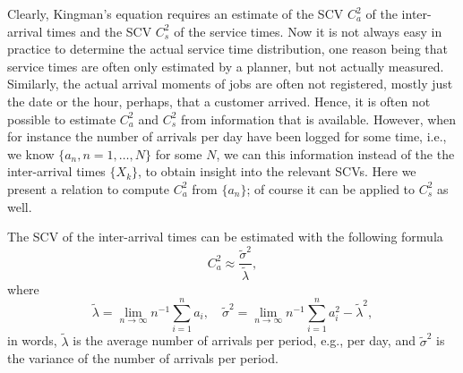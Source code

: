 Clearly, Kingman's equation requires an estimate of the SCV $C_a^2$ of
the inter-arrival times and the SCV $C_s^2$ of the service times. Now it is
not always easy in practice to determine the actual service time
distribution, one reason being that service times are often only
estimated by a planner, but not actually measured. Similarly, the
actual arrival moments of jobs are often not registered, mostly just
the date or the hour, perhaps, that a customer arrived.  Hence, it is
often not possible to estimate $C_a^2$ and $C_s^2$ from information
that is available.  However, when for instance the number of arrivals
per day have been logged for some time, i.e., we know
$\{a_n, n=1,\ldots, N\}$ for some $N$, we can this information instead
of the the inter-arrival times $\{X_k\}$, to obtain insight into the
relevant SCVs.  Here we present a relation to compute $C_a^2$ from
$\{a_n\}$; of course it can be applied to $C_s^2$ as well.

\begin{theorem} The SCV of the inter-arrival times can be estimated
  with the following formula
\begin{equation*}
C_a^2 \approx \frac{\tilde \sigma^2}{\tilde \lambda},
\end{equation*}
where 
\begin{equation*}
\tilde  \lambda = \lim_{n\to\infty} n^{-1} \sum_{i=1}^n a_i,\quad  
\tilde  \sigma^2 = \lim_{n\to\infty} n^{-1} \sum_{i=1}^n a_i^2 - \tilde \lambda^2,
\end{equation*}
in words, $\tilde \lambda$ is the average number of arrivals per
period, e.g., per day, and $\tilde \sigma^2 $ is the variance of the
number of arrivals per period.
\end{theorem}

